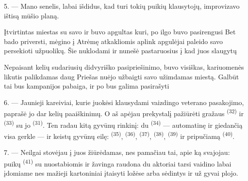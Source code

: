 5. --- Mano senelis, labai išdidus, kad turi tokių puikių klausytojų,
improvizavo ištisą mūšio planą.

Įtvirtintas miestas su savo  ir  buvo apgultas
 kuri, po ilgo  buvo pasirengusi
 Bet  bado priversti, mėgino
 į   Atrėmę
 atkakliomis  aplink 
 apgulėjai paleido savo  persekioti
 užpuolikų. Šie  nuklodami 
 ir   nunešė pastaruosius į
 kad juos slaugytų 

Nepaisant kelių  sudariusių  didvyriško
pasipriešinimo,  buvo visiškas, kariuomenės likutis
 palikdamas daug  Priešas nuėjo užbaigti savo
 užimdamas miestą. Galbūt tai bus kampanijos pabaiga, ir po
 bus galima pasirašyti 

\VUsaut{4.4mm}
\VUsaut{2.8mm}

6. --- Jaunieji kareiviai, kurie juokėsi klausydami vaizdingo veterano pasakojimo,
paprašė jo dar kelių paaiškinimų. O aš apėjau prekystalį pažiūrėti gražaus
 \textsuperscript{(32)} ir  \textsuperscript{(33)} su jo
 \textsuperscript{(31)}. Ten radau kitą gyvūnų rinkinį: du
 \textsuperscript{(34)} --- automatinę
 ir  giedančią visa gerkle --- ir keistų
gyvūnų eilę:  \textsuperscript{(35)}, 
\textsuperscript{(36)},  \textsuperscript{(37)}, 
\textsuperscript{(38)},  \textsuperscript{(39)} ir pripučiamą
 \textsuperscript{(40)}.

7. --- Neilgai stovėjau į juos žiūrėdamas, nes pamačiau tai, apie ką svajojau: puikų
 \textsuperscript{(41)} su nuostabiomis
 ir žavinga raudona   du
aktoriai tarsi vaidino  labai įdomiame  nes mažieji
kartoniniai  įtaisyti ložėse arba sėdintys  ir
 už  gyvai plojo.

